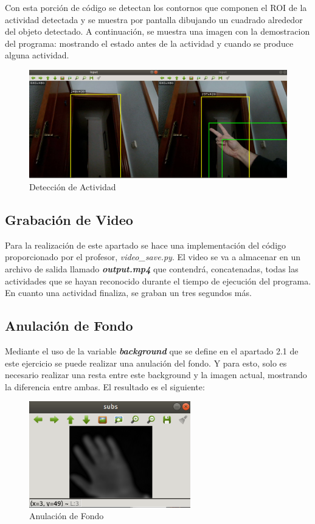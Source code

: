 \documentclass[a4paper]{article} %
\begin{document}
Con esta porción de código se detectan los contornos que componen el ROI de la actividad detectada y se muestra por pantalla dibujando un cuadrado alrededor del objeto detectado. A continuación, se muestra una imagen con la demostracion del programa: mostrando el estado antes de la actividad y cuando se produce alguna actividad.

\begin{figure}[htp]
    \centering
    \includegraphics[width=12cm]{imagenes/ACTIVIDAD-detector.png}
    \caption{Detección de Actividad}
    \label{fig:detect}
\end{figure}


\subsection{Grabación de Video}

Para la realización de este apartado se hace una implementación del código proporcionado por el profesor, \textit{video\_save.py}. El video se va a almacenar en un archivo de salida llamado \textbf{\textit{output.mp4}} que contendrá, concatenadas, todas las actividades que se hayan reconocido durante el tiempo de ejecución del programa. En cuanto una actividad finaliza, se graban un tres segundos más.

\subsection{Anulación de Fondo}

Mediante el uso de la variable \textbf{\textit{background}} que se define en el apartado 2.1 de este ejercicio se puede realizar una anulación del fondo. Y para esto, solo es necesario realizar una resta entre este background y la imagen actual, mostrando la diferencia entre ambas. El resultado es el siguiente:

\begin{figure}[htp]
    \centering
    \includegraphics[width=7cm]{imagenes/anulacion.png}
    \caption{Anulación de Fondo}
    \label{fig:fondo}
\end{figure}
\end{document}
